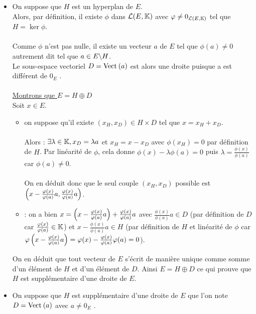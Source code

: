 \begin{dem}
    \begin{itemize}
        \item On suppose que \(H\) est un hyperplan de \(E\).\\
        Alors, par définition, il existe \(\phi\) dans \(\mathcal{L} (E, \mathbb{K})\) avec \(\varphi\neq 0_{\mathcal{L}(E,\mathbb{K})}\) tel que \(H = \ker\phi\).\\~\\
        Comme \(\phi\) n’est pas nulle, il existe un vecteur \(a\) de \(E\) tel que \(\phi(a)\neq 0\) autrement dit tel que \(a \in  E \backslash H\).\\
        Le sous-espace vectoriel \(D = \Vect{a}\) est alors une droite puisque a est différent de \(0_E\) .\\~\\
        \underline{Montrons que \(E = H \oplus D\)}\\
        Soit \(x \in  E\).
        \begin{itemize}
            \item \analyse on suppose qu’il existe \((x_H , x_D) \in  H \times D\) tel que \(x = x_H + x_D\).\\~\\
            Alors : \(\exists\lambda  \in  \mathbb{K}, x_D = \lambda a\) et \(x_H = x - x_D\) avec \(\phi(x_H ) = 0\) par définition de \(H\).
            Par linéarité de \(\phi\), cela donne \(\phi(x) - \lambda\phi(a) = 0\) puis \(\lambda  = \frac{\phi(x)}{\phi(a)}\) car \(\phi(a)\neq 0\).\\~\\
            On en déduit donc que le seul couple \((x_H , x_D)\) possible est \(\left(x - \frac{\varphi(x)}{\varphi(a)} a, \frac{\varphi(x)}{\varphi(a)} a\right)\).
            \item \synthese : on a bien \(x =\left(x - \frac{\varphi(x)}{\varphi(a)} a\right)+ \frac{\varphi(x)}{\varphi(a)}a\) avec \(\frac{\phi(x)}{\phi(a)} a \in  D\) (par définition de \(D\) car \(\frac{\varphi(x)}{\varphi(a)} \in  \mathbb{K}\)) et \(x - \frac{\phi(x)}{\phi(a)} a \in  H\) (par définition de \(H\) et linéarité de \(\phi\) car \(\varphi\left(x - \frac{\varphi(x)}{\varphi(a)} a\right)= \varphi(x) - \frac{\varphi(x)}{\varphi(a)} \varphi(a) = 0\)).
        \end{itemize}
        On en déduit que tout vecteur de \(E\) s’écrit de manière unique comme somme d’un élément de \(H\) et d’un élément de \(D\). Ainsi \(E = H \oplus D\) ce qui prouve que \(H\) est supplémentaire d’une droite de \(E\).
        \item On suppose que \(H\) est supplémentaire d’une droite de \(E\) que l’on note \(D = \Vect{a}\) avec \(a\neq 0_E\) .\\~\\

\end{itemize}
\end{dem}
